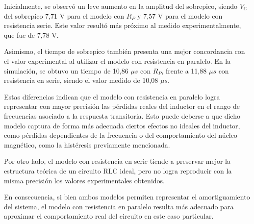 Inicialmente, se observó un leve aumento en la amplitud del sobrepico, siendo $V_C$ del sobrepico 7,71 V para el modelo con $R_P$ y 7,57 V para el modelo con resistencia serie. Este valor resultó más próximo al medido experimentalmente, que fue de 7,78 V.

Asimismo, el tiempo de sobrepico también presenta una mejor concordancia con el valor experimental al utilizar el modelo con resistencia en paralelo. En la simulación, se obtuvo un tiempo de 10,86 $\mu s$ con $R_P$, frente a 11,88 $\mu s$ con resistencia en serie, siendo el valor medido de 10,08 $\mu s$.

Estas diferencias indican que el modelo con resistencia en paralelo logra representar con mayor precisión las pérdidas reales del inductor en el rango de frecuencias asociado a la respuesta transitoria. Esto puede deberse a que dicho modelo captura de forma más adecuada ciertos efectos no ideales del inductor, como pérdidas dependientes de la frecuencia o del comportamiento del núcleo magnético, como la histéresis previamente mencionada.

Por otro lado, el modelo con resistencia en serie tiende a preservar mejor la estructura teórica de un circuito RLC ideal, pero no logra reproducir con la misma precisión los valores experimentales obtenidos.

En consecuencia, si bien ambos modelos permiten representar el amortiguamiento del sistema, el modelo con resistencia en paralelo resulta más adecuado para aproximar el comportamiento real del circuito en este caso particular.